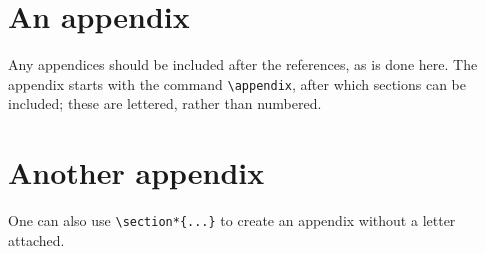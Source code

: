 \documentclass[twoside,11pt]{entics}
\begin{document}


%
%
%
%
%
%
%

\appendix
\section{An appendix}
Any appendices should be included after the references, as is done here. The
appendix starts with the command \verb+\appendix+, after which sections can be
included; these are lettered, rather than numbered. \section*{Another appendix}
One can also use \verb+\section*{...}+ to create an appendix without a letter
attached.
\end{document}
